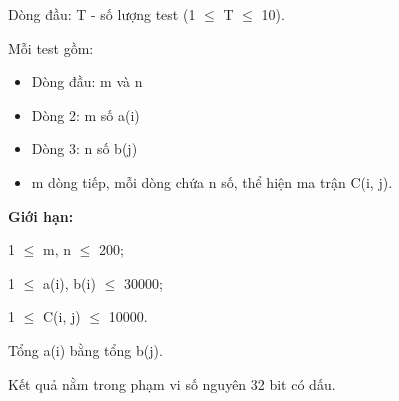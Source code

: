 Dòng đầu: T - số lượng test (1  $\le$  T  $\le$  10).

Mỗi test gồm:
\begin{itemize}
	\item Dòng đầu: m và n
	\item Dòng 2: m số a(i)
	\item Dòng 3: n số b(j)
	\item m dòng tiếp, mỗi dòng chứa n số, thể hiện ma trận C(i, j).
\end{itemize}

\textbf{Giới hạn:}

1  $\le$  m, n  $\le$  200;

1  $\le$  a(i), b(i)  $\le$  30000;

1  $\le$  C(i, j)  $\le$  10000.

Tổng a(i) bằng tổng b(j).

Kết quả nằm trong phạm vi số nguyên 32 bit có dấu.